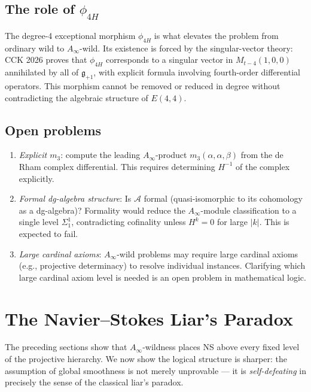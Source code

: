 \documentclass[reqno,10pt]{amsart}
\theoremstyle{plain}
\theoremstyle{definition}
\def\gE{E(4,4)}
\begin{document}
\subsection{The role of $\phi_{4H}$}

The degree-4 exceptional morphism $\phi_{4H}$ is what elevates the problem
from ordinary wild to $A_\infty$-wild.  Its existence is forced by the
singular-vector theory: CCK 2026 proves that $\phi_{4H}$ corresponds to a
singular vector in $M_{t-4}(1,0,0)$ annihilated by all of $\mathfrak{g}_{+1}$,
with explicit formula involving fourth-order differential operators.  This
morphism cannot be removed or reduced in degree without contradicting the
algebraic structure of $\gE$.

\subsection{Open problems}

\begin{enumerate}
  \item \emph{Explicit $m_3$}: compute the leading $A_\infty$-product
        $m_3(\alpha,\alpha,\beta)$ from the de Rham complex differential.
        This requires determining $H^{-1}$ of the complex explicitly.
  \item \emph{Formal dg-algebra structure}: Is $\mathcal{A}$ formal
        (quasi-isomorphic to its cohomology as a dg-algebra)?  Formality
        would reduce the $A_\infty$-module classification to a single
        level $\Sigma_1^1$, contradicting cofinality unless $H^k = 0$
        for large $|k|$.  This is expected to fail.
  \item \emph{Large cardinal axioms}: $A_\infty$-wild problems may require
        large cardinal axioms (e.g., projective determinacy) to resolve
        individual instances.  Clarifying which large cardinal axiom level
        is needed is an open problem in mathematical logic.
\end{enumerate}

\section{The Navier--Stokes Liar's Paradox}\label{sec:liar}

The preceding sections show that $A_\infty$-wildness places NS above
every fixed level of the projective hierarchy.  We now show the logical
structure is sharper: the assumption of global smoothness is not merely
unprovable --- it is \emph{self-defeating} in precisely the sense of the
classical liar's paradox.
\end{document}

